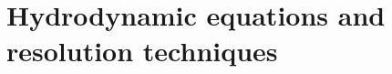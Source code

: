 \documentclass{report}
\begin{document}
%
%






\appendix


\chapter{Hydrodynamic equations and resolution techniques}
\end{document}
